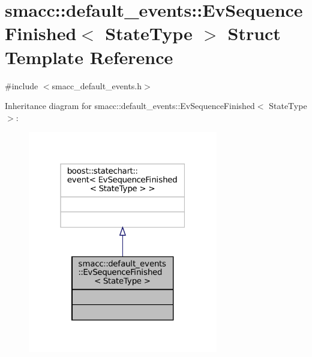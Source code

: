 \hypertarget{structsmacc_1_1default__events_1_1EvSequenceFinished}{}\section{smacc\+:\+:default\+\_\+events\+:\+:Ev\+Sequence\+Finished$<$ State\+Type $>$ Struct Template Reference}
\label{structsmacc_1_1default__events_1_1EvSequenceFinished}


{\ttfamily \#include $<$smacc\+\_\+default\+\_\+events.\+h$>$}



Inheritance diagram for smacc\+:\+:default\+\_\+events\+:\+:Ev\+Sequence\+Finished$<$ State\+Type $>$\+:
\nopagebreak
\begin{figure}[H]
\begin{center}
\leavevmode
\includegraphics[width=235pt]{structsmacc_1_1default__events_1_1EvSequenceFinished__inherit__graph}
\end{center}
\end{figure}


